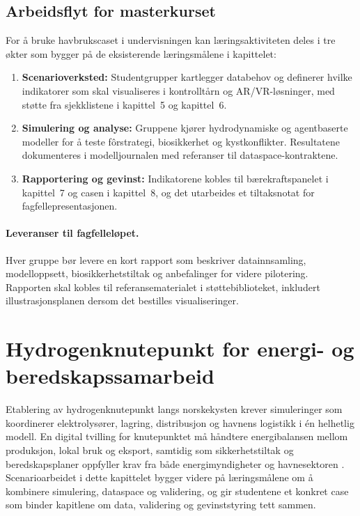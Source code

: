 \subsection{Arbeidsflyt for masterkurset}
For å bruke havbrukscaset i undervisningen kan læringsaktiviteten deles i tre økter som bygger på de eksisterende læringsmålene i kapittelet:
\begin{enumerate}
    \item \textbf{Scenarioverksted:} Studentgrupper kartlegger databehov og definerer hvilke indikatorer som skal visualiseres i kontrolltårn og AR/VR-løsninger, med støtte fra sjekklistene i kapittel~5 og kapittel~6.
    \item \textbf{Simulering og analyse:} Gruppene kjører hydrodynamiske og agentbaserte modeller for å teste fôrstrategi, biosikkerhet og kystkonflikter. Resultatene dokumenteres i modelljournalen med referanser til dataspace-kontraktene.
    \item \textbf{Rapportering og gevinst:} Indikatorene kobles til bærekraftspanelet i kapittel~7 og casen i kapittel~8, og det utarbeides et tiltaksnotat for fagfellepresentasjonen.
\end{enumerate}

\paragraph{Leveranser til fagfelleløpet.} Hver gruppe bør levere en kort rapport som beskriver datainnsamling, modelloppsett, biosikkerhetstiltak og anbefalinger for videre pilotering. Rapporten skal kobles til referansematerialet i støttebiblioteket, inkludert illustrasjonsplanen dersom det bestilles visualiseringer.

\section{Hydrogenknutepunkt for energi- og beredskapssamarbeid}
Etablering av hydrogenknutepunkt langs norskekysten krever simuleringer som koordinerer elektrolysører, lagring, distribusjon og havnens logistikk i én helhetlig modell. En digital tvilling for knutepunktet må håndtere energibalansen mellom produksjon, lokal bruk og eksport, samtidig som sikkerhetstiltak og beredskapsplaner oppfyller krav fra både energimyndigheter og havnesektoren \citep{enova2024hydrogenknutepunkt,gassco2023hydrogen}. Scenarioarbeidet i dette kapittelet bygger videre på læringsmålene om å kombinere simulering, dataspace og validering, og gir studentene et konkret case som binder kapitlene om data, validering og gevinststyring tett sammen.

